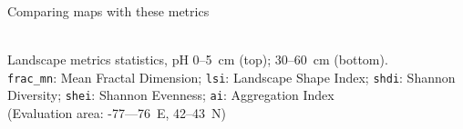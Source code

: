 \documentclass[aspectratio=169, 10pt]{beamer}
\begin{document}
\begin{frame}{Comparing maps with these metrics}
\par
    
      \\[1.5ex]
      Landscape metrics statistics, pH 0--5~cm (top); 30--60~cm (bottom).
      \\[1.5ex]
      \texttt{frac\_mn}: Mean Fractal Dimension; \texttt{lsi}: Landscape Shape Index; \texttt{shdi}: Shannon Diversity; \texttt{shei}: Shannon Evenness; \texttt{ai}: Aggregation Index\\[1.5ex]
      (Evaluation area: -77---76\textdegree~E, 42--43\textdegree~N)
\end{frame}




%    
\end{document}

